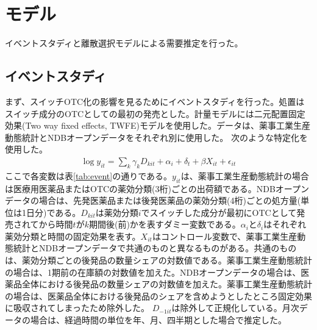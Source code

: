 \documentclass[a4paper,11pt,uplatex]{jsarticle}
\theoremstyle{definition}
\begin{document}
\section{モデル}
イベントスタディと離散選択モデルによる需要推定を行った。
\subsection{イベントスタディ}
まず、スイッチOTC化の影響を見るためにイベントスタディを行った。処置はスイッチ成分のOTCとしての最初の発売とした。計量モデルには二元配置固定効果(Two way fixed effects, TWFE)モデルを使用した。データは、薬事工業生産動態統計とNDBオープンデータをそれぞれ別に使用した。
次のような特定化を使用した。
\begin{align*}
\log y_{it} =\sum_k \gamma_k D_{kit}+\alpha_i +\delta_t+\beta X_{it}+\epsilon_{it}
\end{align*}
ここで各変数は表\ref{tab:event}の通りである。\(y_{it}\)は、薬事工業生産動態統計の場合は医療用医薬品またはOTCの薬効分類(3桁)ごとの出荷額である。NDBオープンデータの場合は、先発医薬品または後発医薬品の薬効分類(4桁)ごとの処方量(単位は1日分)である。\(D_{kit}\)は薬効分類\(i\)でスイッチした成分が最初にOTCとして発売されてから時間\(t\)が\(k\)期間後(前)かを表すダミー変数である。\(\alpha_i\)と\(\delta_i\)はそれぞれ薬効分類と時間の固定効果を表す。\(X_{it}\)はコントロール変数で、薬事工業生産動態統計とNDBオープンデータで共通のものと異なるものがある。共通のものは、薬効分類ごとの後発品の数量シェアの対数値である。薬事工業生産動態統計の場合は、1期前の在庫額の対数値を加えた。NDBオープンデータの場合は、医薬品全体における後発品の数量シェアの対数値を加えた。薬事工業生産動態統計の場合は、医薬品全体における後発品のシェアを含めようとしたところ固定効果に吸収されてしまったため除外した。
\(D_{-1it}\)は除外して正規化している。月次データの場合は、経過時間の単位を年、月、四半期とした場合で推定した。
\end{document}
